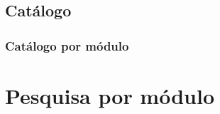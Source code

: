 \documentclass[10pt,a4paper,oneside]{article}
\begin{document}
\begin{landscape}
\part{Catálogo}
\section{Catálogo por módulo}

\end{landscape}

\part{Pesquisa por módulo}






\end{document}

